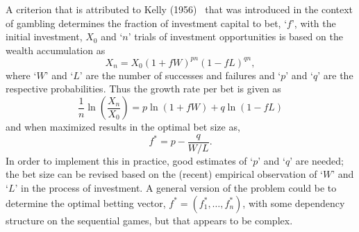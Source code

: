 A criterion that is attributed to Kelly (1956)~\cite{kelly56} that was introduced in the context of gambling determines the fraction of investment capital to bet, `$f$', with the initial investment, $X_0$ and `$n$' trials of investment opportunities is based on the wealth accumulation as
	\begin{equation}\label{eqn:xmx01f}
	X_n= X_0(1+fW)^{pn} (1-fL)^{qn},
	\end{equation}
where `$W$' and `$L$' are the number of successes and failures and `$p$' and `$q$' are the respective probabilities. Thus the growth rate per bet is given as
	\begin{equation}\label{eqn:1nln}
	\dfrac{1}{n} \ln \left(\dfrac{X_n}{X_0}\right)= p \ln(1+fW) + q \ln(1-fL)
	\end{equation}
and when maximized results in the optimal bet size as,
	\begin{equation}\label{eqn:fstarp}
	f^*= p - \dfrac{q}{W/L}.
	\end{equation}
In order to implement this in practice, good estimates of `$p$' and `$q$' are needed; the bet size can be revised based on the (recent) empirical observation of `$W$' and `$L$' in the process of investment. A general version of the problem could be to determine the optimal betting vector, $f^*=(f_1^*, \ldots, f_n^*)$, with some dependency structure on the sequential games, but that appears to be complex. 


